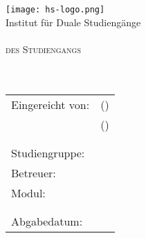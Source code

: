 
\begin{titlepage}

	\begin{center}
		\texttt{[image: hs-logo.png]}\\
		\large{Institut für Duale Studiengänge}\\[4ex]
		
		\large{\scshape \betreff}\\
		\large{\scshape des Studiengangs \studiengang}\\[20ex]
		
		
		\huge{\textbf{\titel}}\\[1.5ex]
		\Large{\textbf{\untertitel}}\\[20ex]
	\end{center}
	
	\begin{tabular} { p{7.5cm} l }
		Eingereicht von: & \autorZweiName (\autorZweiMatrikel) \\
		& \autorName (\autorMatrikel) \\
		\\
		\\
		Studiengruppe: & \autorStudiengruppe \\
		Betreuer: & \betreuer \\
		Modul: & \modul \\
		\\\\
		Abgabedatum: & \abgabeTermin \\
	\end{tabular}


\end{titlepage}